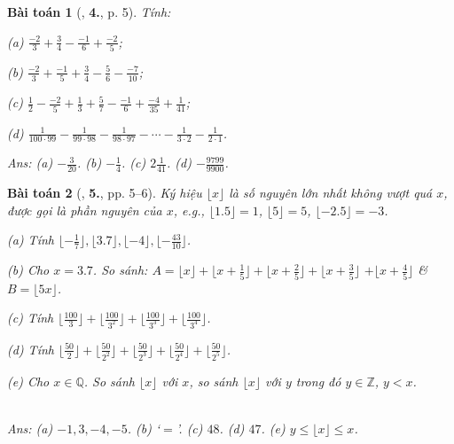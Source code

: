 \documentclass{article}
\numberwithin{equation}{section}
\newtheorem{baitoan}{Bài toán}
\begin{document}
\begin{baitoan}[\cite{Binh_Toan_7_tap_1}, \textbf{4.}, p. 5]
	Tính:
	\begin{enumerate*}
		\item[(a)] $\frac{-2}{3} + \frac{3}{4} - \frac{-1}{6} + \frac{-2}{5}$;
		\item[(b)] $\frac{-2}{3} + \frac{-1}{5} + \frac{3}{4} - \frac{5}{6} - \frac{-7}{10}$;
		\item[(c)] $\frac{1}{2} - \frac{-2}{5} + \frac{1}{3} + \frac{5}{7} - \frac{-1}{6} + \frac{-4}{35} + \frac{1}{41}$;
		\item[(d)] $\frac{1}{100\cdot 99} - \frac{1}{99\cdot 98} - \frac{1}{98\cdot 97} - \cdots - \frac{1}{3\cdot 2} - \frac{1}{2\cdot 1}$.
	\end{enumerate*}\hfill\textsf{Ans:} (a) $-\frac{3}{20}$. (b) $-\frac{1}{4}$. (c) $2\frac{1}{41}$. (d) $-\frac{9799}{9900}$.
\end{baitoan}

\begin{baitoan}[\cite{Binh_Toan_7_tap_1}, \textbf{5.}, pp. 5--6]
	Ký hiệu $\lfloor x\rfloor$ là số nguyên lớn nhất không vượt quá $x$, được gọi là \emph{phần nguyên} của $x$, e.g., $\lfloor 1.5\rfloor = 1$, $\lfloor 5\rfloor = 5$, $\lfloor -2.5\rfloor = -3$.
	\begin{enumerate*}
		\item[(a)] Tính $\lfloor-\frac{1}{7}\rfloor,\lfloor 3.7\rfloor,\lfloor-4\rfloor,\lfloor-\frac{43}{10}\rfloor$.
		\item[(b)] Cho $x = 3.7$. So sánh: $A = \lfloor x\rfloor + \lfloor x + \frac{1}{5}\rfloor + \lfloor x + \frac{2}{5}\rfloor + \lfloor x + \frac{3}{5}\rfloor$ $+ \lfloor x + \frac{4}{5}\rfloor$ \& $B = \lfloor 5x\rfloor$.
		\item[(c)] Tính $ \lfloor\frac{100}{3}\rfloor + \lfloor\frac{100}{3^2}\rfloor + \lfloor\frac{100}{3^3}\rfloor + \lfloor\frac{100}{3^4}\rfloor$.
		\item[(d)] Tính $ \lfloor\frac{50}{2}\rfloor + \lfloor\frac{50}{2^2}\rfloor + \lfloor\frac{50}{2^3}\rfloor + \lfloor\frac{50}{2^4}\rfloor + \lfloor\frac{50}{2^5}\rfloor$.
		\item[(e)] Cho $x\in\mathbb{Q}$. So sánh $\lfloor x\rfloor$ với $x$, so sánh $\lfloor x\rfloor$ với $y$ trong đó $y\in\mathbb{Z}$, $y < x$.
	\end{enumerate*}\\\mbox{}\hfill\textsf{Ans:} (a) $-1,3,-4,-5$. (b) `$=$'. (c) $48$. (d) $47$. (e) $y\le\lfloor x\rfloor\le x$.
\end{baitoan}
\end{document}
